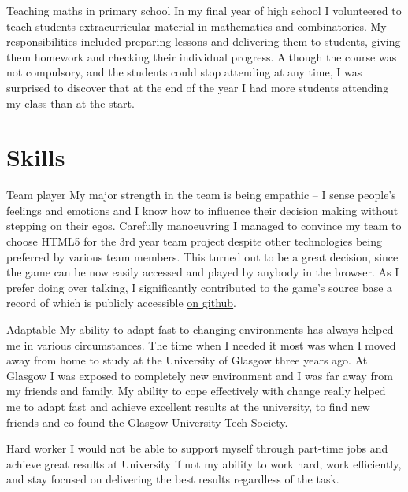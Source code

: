 \documentclass{tccv}
\begin{document}
\begin{skillist}
\item{Teaching maths in primary school} {In my final year of high school I volunteered to teach students extracurricular material in mathematics and combinatorics. My responsibilities included preparing lessons and delivering them to students, giving them homework and checking their individual progress. Although the course was not compulsory, and the students could stop attending at any time, I was surprised to discover that at the end of the year I had more students attending my class than at the start.}

\end{skillist}

\newpage


\section{Skills}

\begin{skillist}
\item{Team player} {My major strength in the team is being empathic -- I sense people's feelings and emotions and I know how to influence their decision making without stepping on their egos. Carefully manoeuvring I managed to convince my team to choose HTML5 for the 3rd year team project despite other technologies being preferred by various team members. This turned out to be a great decision, since the game can be now easily accessed and played by anybody in the browser. As I prefer doing over talking, I significantly contributed to the game's source base a record of which is publicly accessible \href{https://github.com/ivababukova/TP3-Security-game}{on github}.}

\item{Adaptable} {My ability to adapt fast to changing environments has always helped me in various circumstances. The time when I needed it most was when I moved away from home to study at the University of Glasgow three years ago. At Glasgow I was exposed to completely new environment and I was far away from my friends and family. My ability to cope effectively with change really helped me to adapt fast and achieve excellent results at the university, to find new friends and co-found the Glasgow University Tech Society.}

\item{Hard worker} {I would not be able to support myself through part-time jobs and achieve great results at University if not my ability to work hard, work efficiently, and stay focused on delivering the best results regardless of the task.}

\end{skillist}
\newpage
\end{document}
